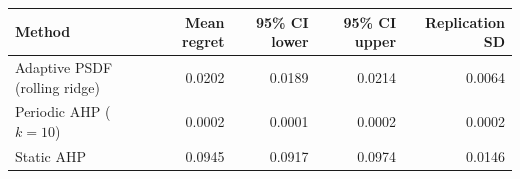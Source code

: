 \begin{tabular}{lrrrr}
\toprule
Method & Mean regret & 95\% CI lower & 95\% CI upper & Replication SD \\
\midrule
Adaptive PSDF (rolling ridge) & 0.0202 & 0.0189 & 0.0214 & 0.0064 \\
Periodic AHP ($k=10$) & 0.0002 & 0.0001 & 0.0002 & 0.0002 \\
Static AHP & 0.0945 & 0.0917 & 0.0974 & 0.0146 \\
\bottomrule
\end{tabular}
